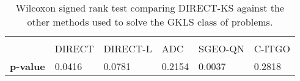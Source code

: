 \begin{table*}[h]
    \tiny
    \begin{center}
    
    \begin{tabular}{ P{1.0cm} P{1.0cm} P{1.2cm} P{1.0cm} P{1.0cm} P{1.0cm} }
                     &         &          &          &          &        \\[2em]
                     &  DIRECT & DIRECT-L &    ADC   &    SGEO-QN   & C-ITGO \\[1em]
    \rule{0pt}{3ex}
    \textbf{p-value} & 0.0416 & 0.0781 & 0.2154 & 0.0037 & 0.2818 \\


    \end{tabular}
    \end{center}
    \vspace*{-4mm}
    \captionsetup{justification=centering}
    \caption{Wilcoxon signed rank test comparing DIRECT-KS against the other methods used to solve the GKLS class of problems. \\[2em]}
    \label{tab:Wilcoxon2}
\end{table*}